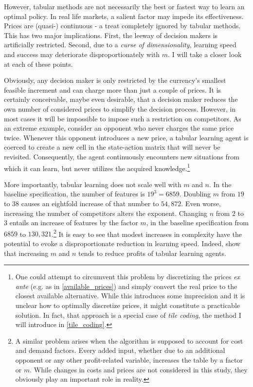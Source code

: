 However, tabular methods are not necessarily the best or fastest way to learn an optimal policy. In real life markets, a salient factor may impede its effectiveness. Prices are (quasi-) continuous - a treat completely ignored by tabular methods. This has two major implications. First, the leeway of decision makers is artificially restricted. Second, due to a \emph{curse of dimensionality}, learning speed and success may deteriorate disproportionately with $m$. I will take a closer look at each of these points.

Obviously, any decision maker is only restricted by the currency's smallest feasible increment and can charge more than just a couple of prices. It is certainly conceivable, maybe even desirable, that a decision maker reduces the own number of considered prices to simplify the decision process. However, in most cases it will be impossible to impose such a restriction on competitors. As an extreme example, consider an opponent who never charges the same price twice. Whenever this opponent introduces a new price, a tabular learning agent is coerced to create a new cell in the state-action matrix that will never be revisited. Consequently, the agent continuously encounters new situations from which it can learn, but never utilizes the acquired knowledge.\footnote{One could attempt to circumvent this problem by discretizing the prices \emph{ex ante} (e.g. as in \autoref{available_prices}) and simply convert the real price to the closest available alternative. While this introduces some imprecision and it is unclear how to optimally discretize prices, it might constitute a practicable solution. In fact, that approach is a special case of \emph{tile coding}, the method I will introduce in \autoref{tile_coding}.}

More importantly, tabular learning does not scale well with $m$ and $n$. In the baseline specification, the number of features is $19^3 = 6859$. Doubling $m$ from $19$ to $38$ causes an eightfold increase of that number to $54,872$. Even worse, increasing the number of competitors alters the exponent. Changing $n$ from $2$ to $3$ entails an increase of features by the factor $m$, in the baseline specification from $6859$ to $130,321$.\footnote{A similar problem arises when the algorithm is supposed to account for cost and demand factors. Every added input, whether due to an additional opponent or any other profit-related variable, increases the table by a factor or $m$. While changes in costs and prices are not considered in this study, they obviously play an important role in reality.} It is easy to see that modest increases in complexity have the potential to evoke a disproportionate reduction in learning speed. Indeed, \textcite{calvano_algorithmic_2018} show that increasing $m$ and $n$ tends to reduce profits of tabular learning agents.

